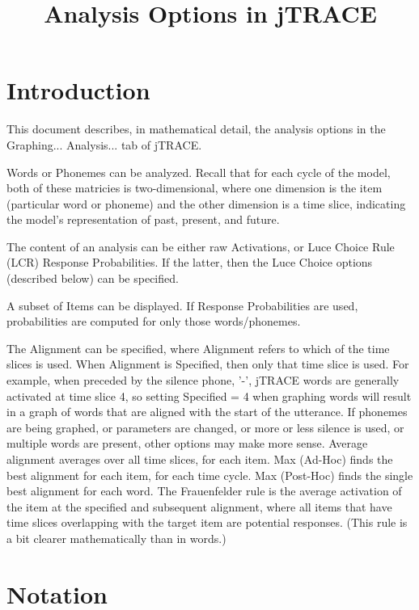 \documentclass{article}
\begin{document}
\title{Analysis Options in jTRACE}

\maketitle

\section{Introduction}

This document describes, in mathematical detail, the analysis options in
the Graphing... Analysis... tab of jTRACE. 

Words or Phonemes can be analyzed. Recall that for each cycle of the model,
both of these matricies is two-dimensional, where one dimension is the item
(particular word or phoneme) and the other dimension is a time slice, 
indicating the model's representation of past, present, and future. 

The content of an analysis can be either raw Activations, or Luce Choice
Rule (LCR) Response Probabilities. If the latter, then the Luce Choice options
(described below) can be specified.

A subset of Items can be displayed. If Response Probabilities are used, 
probabilities are computed for only those words/phonemes.

The Alignment can be specified, where Alignment refers to which of the time
slices is used. When Alignment is Specified, then only that time slice is
used. For example, when preceded by the silence phone, '-', jTRACE words 
are generally activated at time slice 4, so setting Specified = 4 when
graphing words will result
in a graph of words that are aligned with the start of the utterance. If 
phonemes are being graphed, or
parameters are changed, or more or less silence is used, or multiple words
are present, other options may make more sense. Average alignment averages
over all time slices, for each item. Max (Ad-Hoc) finds the best alignment for
each item, for each time cycle. Max (Post-Hoc) finds the single
best alignment for each word. The Frauenfelder rule is the average activation
of the item at the specified and subsequent alignment, where all items that
have time slices overlapping with the target item are potential responses.
(This rule is a bit clearer mathematically than in words.)

\section{Notation}
\end{document}
